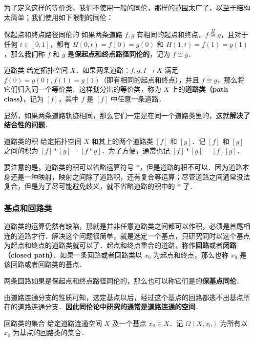 为了定义这样的等价类，我们不使用一般的同伦，那样的范围太广了，以至于结构太简单；我们使用如下限制的同伦：

\begin{definition}{保起点和终点路径同伦的}\label{HomT3_def2}
如果两条道路 $f, g$ 有相同的起点和终点，$f\overset{H}{\cong}g$，且对于任何 $t\in [0, 1]$，都有 $H(0, t)=f(0)=g(0)$ 和 $H(1, t)=f(1)=g(1)$，那么我们称 $f$ 和 $g$ 是\textbf{保起点和终点路径同伦的}，记为 $f\dot{\cong}g$．
\end{definition}

\begin{definition}{道路类}
给定拓扑空间 $X$．如果两条道路：$f, g:I\rightarrow X$ 满足 $f(0)=g(0), f(1)=g(1)$（即有相同的起点和终点），并且 $f\dot{\cong}g$，那么将它们归入同一个等价类．这样划分出的等价类，称为 $X$ 上的\textbf{道路类（path class）}，记为 $[f]$，其中 $f$ 是 $[f]$ 中任意一条道路．
\end{definition}

显然，如果两条道路轨迹相同，那么它们一定是在同一个道路类里的，这就\textbf{解决了结合性的问题}．

\begin{definition}{道路类的积}
给定拓扑空间 $X$ 和其上的两个道路类 $[f]$ 和 $[g]$．记 $[f]$ 和 $[g]$ 之间的积为 $[f]*[g]=[f*g]$．为了方便，通常也记 $[f]*[g]=[f][g]$．
\end{definition}

要注意的是，道路类的积可以省略运算符号 $*$，但是道路的积不可以．因为道路本身还是一种映射，映射之间除了道路积，还有复合等运算；尽管道路之间通常没法复合，但是为了尽可能避免歧义，就不省略道路的积中的 $*$ 了．

\subsubsection{基点和回路类}

道路类的运算仍然有缺陷，那就是并非任意道路类之间都可以作积，必须是首尾相连的道路才行．解决这个问题很简单，就是选定一个基点，只研究同时以这个基点为起点和终点的道路类就可以了．起点和终点重合的道路，称作\textbf{回路}或者\textbf{闭路（closed path）}．如果一条回路或者回路类以 $x_0$ 为起点和终点，那么也称 $x_0$ 是该回路或者回路类的基点．

两条回路如果是保起点和终点路径同伦的，那么也可以称它们是的\textbf{保基点同伦}．

由道路连通分支的性质可知，选定基点以后，经过这个基点的回路都逃不出基点所在的道路连通分支．\textbf{因此同伦论中研究的通常是道路连通的空间}．

\begin{definition}{回路类的集合}
给定道路连通空间 $X$ 及一个基点 $x_0\in X$．记 $\Omega(X, x_0)$ 为所有以 $x_0$ 为基点的回路类的集合．
\end{definition}

